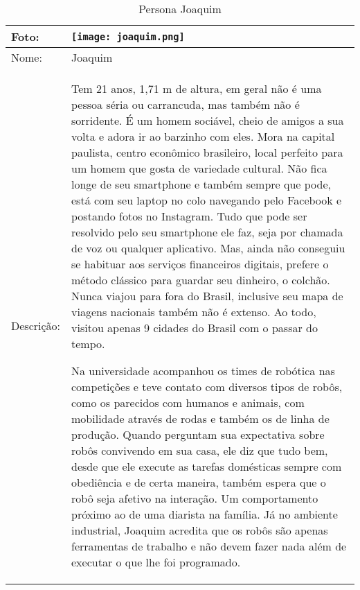 \begin{table}[!ht]
	\caption{Persona Joaquim}
	\label{tab:joaquim}
	\centering
	\begin{tabular}{ m{2 cm} | m{13cm} }
		\hline
		Foto: & \rule{0cm}{2.7cm} \texttt{[image: joaquim.png]} \\
		\hline
		Nome: & Joaquim \\
		\hline
		Descrição: & Tem 21 anos, 1,71 m de altura, em geral não é uma pessoa séria ou carrancuda, mas também não é sorridente. É um homem sociável, cheio de amigos a sua volta e adora ir ao barzinho com eles. Mora na capital paulista, centro econômico brasileiro, local perfeito para um homem que gosta de variedade cultural. Não fica longe de seu smartphone e também sempre que pode, está com seu laptop no colo navegando pelo Facebook e postando fotos no Instagram. Tudo que pode ser resolvido pelo seu smartphone ele faz, seja por chamada de voz ou qualquer aplicativo. Mas, ainda não conseguiu se habituar aos serviços financeiros digitais, prefere o método clássico para guardar seu dinheiro, o colchão. Nunca viajou para fora do Brasil, inclusive seu mapa de viagens nacionais também não é extenso. Ao todo, visitou apenas 9 cidades do Brasil com o passar do tempo.

		Na universidade acompanhou os times de robótica nas competições e teve contato com diversos tipos de robôs, como os parecidos com humanos e animais, com mobilidade através de rodas e também os de linha de produção. Quando perguntam sua expectativa sobre robôs convivendo em sua casa, ele diz que tudo bem, desde que ele execute as tarefas domésticas sempre com obediência e de certa maneira, também espera que o robô seja afetivo na interação. Um comportamento próximo ao de uma diarista na família. Já no ambiente industrial, Joaquim acredita que os robôs são apenas ferramentas de trabalho e não devem fazer nada além de executar o que lhe foi programado. \\
		\hline
	\end{tabular}
\end{table}

